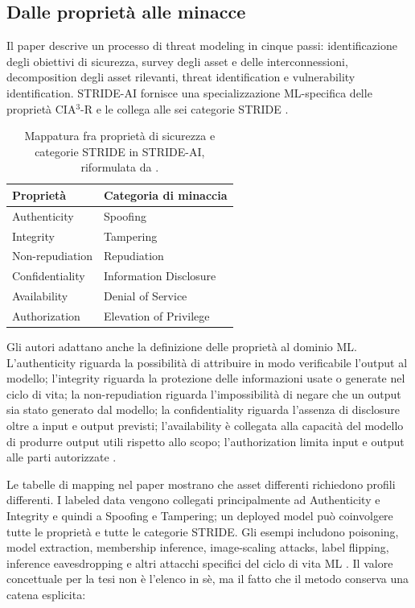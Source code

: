 \documentclass[12pt,a4paper,oneside]{report}
\begin{document}
\subsection{Dalle proprietà alle minacce}

Il paper descrive un processo di threat modeling in cinque passi: identificazione degli obiettivi di sicurezza, survey degli asset e delle interconnessioni, decomposition degli asset rilevanti, threat identification e vulnerability identification. STRIDE-AI fornisce una specializzazione ML-specifica delle proprietà CIA$^3$-R e le collega alle sei categorie STRIDE \citep{mauri2022strideai}.

\begin{table}[htbp]
\centering
\caption{Mappatura fra proprietà di sicurezza e categorie STRIDE in STRIDE-AI, riformulata da \citet{mauri2022strideai}.}
\label{tab:strideai-map}
\small
\begin{tabular}{ll}
\toprule
\textbf{Proprietà} & \textbf{Categoria di minaccia} \\
\midrule
Authenticity & Spoofing \\
Integrity & Tampering \\
Non-repudiation & Repudiation \\
Confidentiality & Information Disclosure \\
Availability & Denial of Service \\
Authorization & Elevation of Privilege \\
\bottomrule
\end{tabular}
\end{table}

Gli autori adattano anche la definizione delle proprietà al dominio ML. L'authenticity riguarda la possibilità di attribuire in modo verificabile l'output al modello; l'integrity riguarda la protezione delle informazioni usate o generate nel ciclo di vita; la non-repudiation riguarda l'impossibilità di negare che un output sia stato generato dal modello; la confidentiality riguarda l'assenza di disclosure oltre a input e output previsti; l'availability è collegata alla capacità del modello di produrre output utili rispetto allo scopo; l'authorization limita input e output alle parti autorizzate \citep{mauri2022strideai}.

Le tabelle di mapping nel paper mostrano che asset differenti richiedono profili differenti. I labeled data vengono collegati principalmente ad Authenticity e Integrity e quindi a Spoofing e Tampering; un deployed model può coinvolgere tutte le proprietà e tutte le categorie STRIDE. Gli esempi includono poisoning, model extraction, membership inference, image-scaling attacks, label flipping, inference eavesdropping e altri attacchi specifici del ciclo di vita ML \citep{mauri2022strideai}. Il valore concettuale per la tesi non è l'elenco in sè, ma il fatto che il metodo conserva una catena esplicita:
\end{document}
